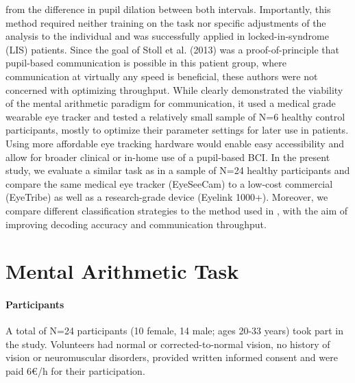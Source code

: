 \documentclass[manuscript]{acmart}
\begin{document}
from the difference in pupil dilation between both intervals. Importantly, this method required neither training on the task nor specific adjustments of the analysis to the individual and was successfully applied in locked-in-syndrome (LIS) patients. 
Since the goal of Stoll et al. (2013) \cite{Stoll2013} was a proof-of-principle that pupil-based communication is possible in this patient group, where communication at virtually any speed is beneficial, these authors were not concerned with optimizing throughput. While \cite{Stoll2013} clearly demonstrated the viability of the mental arithmetic paradigm for communication, it used a medical grade wearable eye tracker \cite{Stoll2011,Schneider2009} and tested a relatively small sample of N=6 healthy control participants, mostly to optimize their parameter settings for later use in patients. Using more affordable eye tracking hardware would enable easy accessibility and allow for broader clinical or in-home use of a pupil-based BCI. In the present study, we evaluate a similar task as \cite{Stoll2013} in a sample of N=24 healthy participants and compare the same medical eye tracker (EyeSeeCam) to a low-cost commercial (EyeTribe) as well as a research-grade device (Eyelink 1000+). Moreover, we compare different classification strategies to the method used in \cite{Stoll2013}, with the aim of improving decoding accuracy and communication throughput. 

\section{Mental Arithmetic Task}

\paragraph{Participants} A total of N=24 participants (10 female, 14 male; ages 20-33 years) took part in the study. Volunteers had normal or corrected-to-normal vision, no history of vision or neuromuscular disorders, provided written informed consent and were paid 6€/h for their participation.
\end{document}

